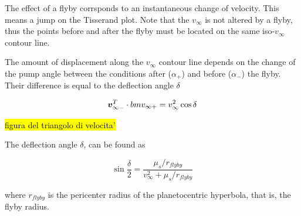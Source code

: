 \documentclass{article}
\newcommand{\vinf}{v_\infty}
\begin{document}
The effect of a flyby corrsponds to an instantaneous change of velocity.
This means a jump on the Tisserand plot.
Note that the $\vinf$ is not altered by a flyby, thus the points before and after the flyby must be located on the same iso-$\vinf$ contour line.

The amount of displacement along the  $\vinf$ contour line depends on the change of the pump angle between the conditions after ($\alpha_+$) and before ($\alpha_-$) the flyby.
Their difference is equal to the deflection angle $\delta$

\begin{equation}
    \bm{v}_{\infty-}^T \cdot \\bm{v}_{\infty+} = \vinf^2 \cos\delta
\end{equation}

\hl{figura del triangolo di velocita'}

The deflection angle $\delta$, can be found as

\begin{equation}
    \sin\frac{\delta}{2} = \frac{\mu_s/r_{flyby}}{\vinf^2+\mu_s/r_{flyby}}
\end{equation}

where $r_{flyby}$ is the pericenter radius of the planetocentric hyperbola, that is, the flyby radius.
\end{document}
